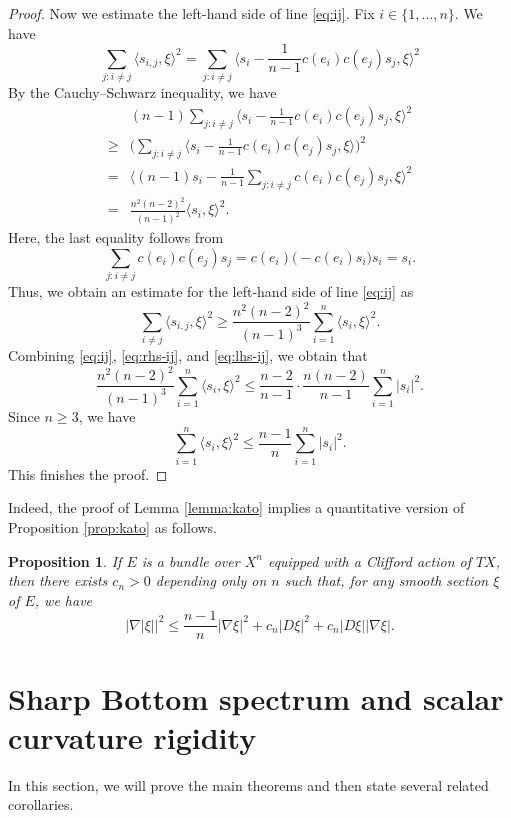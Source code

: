 \documentclass[12pt, reqno]{amsart}
\theoremstyle{plain}%
\newtheorem{proposition}[theorem]{Proposition}
\theoremstyle{definition}
\theoremstyle{remark}
\numberwithin{equation}{section}
\begin{document}
\begin{proof}
	Now we estimate the left-hand side of line \eqref{eq:ij}. Fix $i\in\{1,\ldots,n\}$. We have
	$$\sum_{j:i\ne j}\langle s_{i,j},\xi\rangle^2=\sum_{j:i\ne j}\langle s_i-\frac{1}{n-1}c(e_i)c(e_j)s_j,\xi\rangle^2$$ 
	By the Cauchy--Schwarz inequality, we have
	\begin{equation}
		\begin{split}
			&(n-1)\sum_{j:i\ne j}\langle s_i-\frac{1}{n-1}c(e_i)c(e_j)s_j,\xi\rangle^2\\
			\geq&\Big(\sum_{j:i\ne j}\langle s_i-\frac{1}{n-1}c(e_i)c(e_j)s_j,\xi\rangle\Big)^2\\
			=&\Big\langle (n-1)s_i-\frac{1}{n-1}\sum_{j:i\ne j}c(e_i)c(e_j)s_j,\xi\Big\rangle^2\\
			=&\frac{n^2(n-2)^2}{(n-1)^2}\langle s_i,\xi\rangle^2.
		\end{split}
	\end{equation}
	Here, the last equality follows from
	$$\sum_{j:i\ne j}c(e_i)c(e_j)s_j=c(e_i)\Big(-c(e_i)s_i\Big)s_i=s_i.$$
	Thus, we obtain an estimate for the left-hand side of line \eqref{eq:ij} as
	\begin{equation}\label{eq:lhs-ij}
		\sum_{i\ne j}\langle s_{i,j},\xi\rangle^2\geq \frac{n^2(n-2)^2}{(n-1)^3}\sum_{i=1}^n\langle s_i,\xi\rangle^2.
	\end{equation}
	Combining \eqref{eq:ij}, \eqref{eq:rhs-ij}, and \eqref{eq:lhs-ij}, we obtain that
	$$\frac{n^2(n-2)^2}{(n-1)^3}\sum_{i=1}^n\langle s_i,\xi\rangle^2\leq \frac{n-2}{n-1}\cdot \frac{n(n-2)}{n-1}\sum_{i=1}^n|s_i|^2.$$
	Since $n\geq 3$, we have
	$$\sum_{i=1}^n\langle s_i,\xi\rangle^2\leq \frac{n-1}{n}\sum_{i=1}^n|s_i|^2.$$
	This finishes the proof.
\end{proof}

Indeed, the proof of Lemma \ref{lemma:kato} implies a quantitative version of Proposition \ref{prop:kato} as follows.

\begin{proposition}\label{prop:kato2}
	If $E$ is a bundle over $X^n$ equipped with a Clifford action of $TX$, then there exists $c_n>0$  depending only on $n$ such that, for any smooth section $\xi$ of $E$, we have
	$$\Big|\nabla|\xi|\Big|^2\leq \frac{n-1}{n}|\nabla\xi|^2+c_n|D\xi|^2+c_n|D\xi||\nabla\xi|.$$
\end{proposition}

\section{Sharp Bottom spectrum and scalar curvature rigidity} \label{sec: proof_of_main_thm}
In this section, we will prove the main theorems and then state several related corollaries. 
\end{document}
